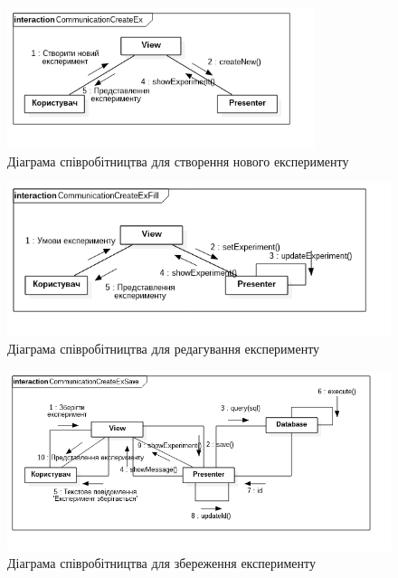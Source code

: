 \begin{figure}[H]
  \centering
    \includegraphics[width=0.8\textwidth]{uml_communication_experiment_create}
  \caption{Діаграма співробітництва для створення нового експерименту}
  \label{fig:uml_communication_experiment_create}
\end{figure}

\begin{figure}[H]
  \centering
    \includegraphics[width=1\textwidth]{uml_communication_experiment_edit}
  \caption{Діаграма співробітництва для редагування експерименту}
  \label{fig:uml_communication_experiment_edit}
\end{figure}

\begin{figure}[H]
  \centering
    \includegraphics[width=1\textwidth]{uml_communication_experiment_save}
  \caption{Діаграма співробітництва для збереження експерименту}
  \label{fig:uml_communication_experiment_save}
\end{figure}

